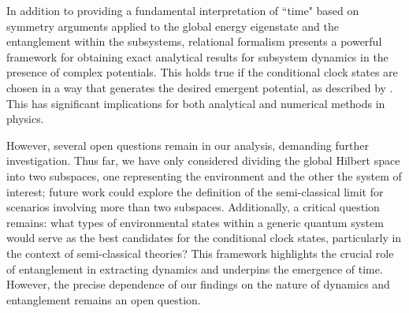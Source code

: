 In addition to providing a fundamental interpretation of ``time" based on symmetry arguments applied to the global energy eigenstate and the entanglement within the subsystems, relational formalism presents a powerful framework for obtaining exact analytical results for subsystem dynamics in the presence of complex potentials. This holds true if the conditional clock states are chosen in a way that generates the desired emergent potential, as described by . This has significant implications for both analytical and numerical methods in physics.

However, several open questions remain in our analysis, demanding further investigation. Thus far, we have only considered dividing the global Hilbert space into two subspaces, one representing the environment and the other the system of interest; future work could explore the definition of the semi-classical limit for scenarios involving more than two subspaces. Additionally, a critical question remains: what types of environmental states within a generic quantum system would serve as the best candidates for the conditional clock states, particularly in the context of semi-classical theories? This framework highlights the crucial role of entanglement in extracting dynamics and underpins the emergence of time. However, the precise dependence of our findings on the nature of dynamics and entanglement remains an open question.